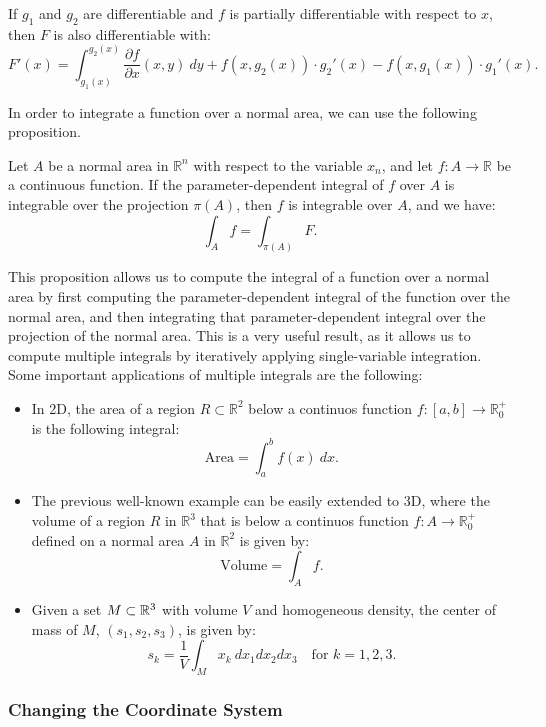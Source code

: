 If $g_1$ and $g_2$ are differentiable and $f$ is partially differentiable with respect to $x$, then $F$ is also differentiable with:
\[
    F'(x) = \int_{g_1(x)}^{g_2(x)} \frac{\partial f}{\partial x}(x,y)\ dy + f(x, g_2(x)) \cdot g_2'(x) - f(x, g_1(x)) \cdot g_1'(x).
\]

In order to integrate a function over a normal area, we can use the following proposition.
\begin{prop}
    Let $A$ be a normal area in $\mathbb{R}^n$ with respect to the variable $x_n$, and let $f : A \to \mathbb{R}$ be a continuous function. If the parameter-dependent integral of $f$ over $A$ is integrable over the projection $\pi(A)$, then $f$ is integrable over $A$, and we have:
\[
    \int_A f = \int_{\pi(A)} F.
\]
\end{prop}
This proposition allows us to compute the integral of a function over a normal area by first computing the parameter-dependent integral of the function over the normal area, and then integrating that parameter-dependent integral over the projection of the normal area. This is a very useful result, as it allows us to compute multiple integrals by iteratively applying single-variable integration. Some important applications of multiple integrals are the following:
\begin{itemize}
    \item In 2D, the area of a region $R\subset \mathbb{R}^2$ below a continuos function $f:[a, b] \to \mathbb{R}^+_0$ is the following integral:
    \[
        \text{Area} = \int_a^b f(x)\ dx.
    \]
    \item The previous well-known example can be easily extended to 3D, where the volume of a region $R$ in $\mathbb{R}^3$ that is below a continuos function $f : A \to \mathbb{R}^+_0$ defined on a normal area $A$ in $\mathbb{R}^2$ is given by:
    \[
        \text{Volume} = \int_A f.
    \]
    \item Given a set $M\subset \mathbb{R}^3$ with volume $V$ and homogeneous density, the center of mass of $M$, $(s_1, s_2, s_3)$, is given by:
    \begin{equation*}
        s_k = \frac{1}{V} \int_M x_k\ dx_1 dx_2 dx_3 \quad \text{for } k = 1, 2, 3.
    \end{equation*}
\end{itemize}


\subsubsection{Changing the Coordinate System}

